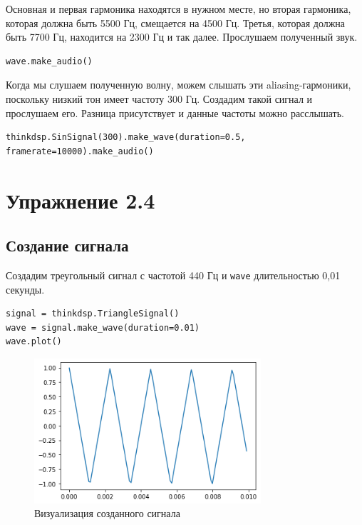 \documentclass[a4paper,12pt]{report}
\begin{document}
Основная и первая гармоника находятся в нужном месте, но вторая гармоника, которая должна быть 5500 Гц, смещается на 4500 Гц. Третья, которая должна быть 7700 Гц, находится на 2300 Гц и так далее. Прослушаем полученный звук.

\begin{lstlisting}[caption=Воспроизведение прямоугольного сигнала]
wave.make_audio()
\end{lstlisting}

Когда мы слушаем полученную волну, можем слышать эти aliasing-гармоники, поскольку низкий тон имеет частоту 300 Гц. Создадим такой сигнал и прослушаем его. Разница присутствует и данные частоты можно расслышать.

\begin{lstlisting}[caption=Создание и воспроизведение сигнала с пониженной частотой]
thinkdsp.SinSignal(300).make_wave(duration=0.5, framerate=10000).make_audio()
\end{lstlisting}

\chapter{Упражнение 2.4}
\section{Создание сигнала}

Создадим треугольный сигнал с частотой 440 Гц и \texttt{wave} длительностью 0,01 секунды.

\begin{lstlisting}[caption=Создание треугольного сигнала]
signal = thinkdsp.TriangleSignal()
wave = signal.make_wave(duration=0.01)
wave.plot()
\end{lstlisting}

\begin{figure}[H]
        \centering
        \includegraphics[width=0.75\textwidth]{4.png}
        \caption{Визуализация созданного сигнала}
        \label{fig:ig4_1}
\end{figure}
\end{document}
